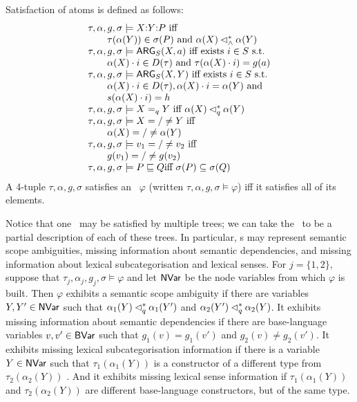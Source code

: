 \begin{definition}\label{defn:satisfaction}
Satisfaction of atoms is defined as follows:
$$
\begin{array}{l}
  \tau, \alpha, g, \sigma \models  X {:} Y {:} P
\mbox{ iff}\\
\qquad \tau(\alpha(Y)) \in \sigma(P) \mbox{ and } \alpha(X) \lhd^*_\wedge
  \alpha(Y) \\
  \tau, \alpha, g, \sigma \models \mathsf{ARG}_S(X,a)
\mbox{ iff exists  $i \in S$ s.t.}\\
\qquad  \alpha(X) \cdot i \in D(\tau) \mbox{ and }
  \tau(\alpha(X) \cdot 
  i) = g(a) \\
  \tau, \alpha, g, \sigma \models \mathsf{ARG}_S(X,Y)
\mbox{ iff  exists $i \in S$ s.t.}\\
\qquad \alpha(X) \cdot i \in D(\tau), \alpha(X) \cdot
  i = \alpha(Y) \mbox{ and }\\
\qquad
s(\alpha(X) \cdot i) = h \\
  \tau, \alpha, g, \sigma \models X =_q Y
\mbox{ iff } \alpha(X) \lhd^*_q \alpha(Y) \\
  \tau, \alpha, g, \sigma \models X ={/}\neq Y
\mbox{ iff } \\
\qquad \alpha(X) ={/}\neq \alpha(Y) \\
  \tau, \alpha, g, \sigma \models v_1 ={/}\neq v_2
\mbox{ iff}\\
\qquad g(v_1) ={/}\neq g(v_2) \\
  \tau, \alpha, g, \sigma \models P \sqsubseteq Q
\mbox{iff $\sigma(P) \subseteq \sigma(Q)$}
\end{array}
$$
A 4-tuple $\tau,\alpha,g,\sigma$ satisfies an \rmrs\ $\varphi$
(written $\tau,\alpha,g,\sigma \models \varphi$) iff it satisfies all
of its elements.
\end{definition}

Notice that one \rmrs\ may be satisfied by multiple trees; we can take
the \rmrs\ to be a partial description of each of these trees.  In
particular, \rmrs s may represent semantic scope ambiguities, missing
information about semantic dependencies, and missing information about
lexical subcategorisation and lexical senses.  For $j=\{1,2\}$,
suppose that $\tau_j,\alpha_j,g_j,\sigma\models \varphi$ and let
$\mathsf{NVar}$ be the node variables from which $\varphi$ is built.  Then
$\varphi$ exhibits a semantic scope ambiguity if there are variables
$Y,Y'\in \mathsf{NVar}$ such that $\alpha_1(Y) \lhd^*_q \alpha_1(Y')$ and
$\alpha_2(Y')\lhd^*_q \alpha_2(Y)$.  It exhibits missing information
about semantic dependencies if there are base-language variables $
v,v'\in \mathsf{BVar}$ such that $g_1(v)=g_1(v')$ and $g_2(v)\neq g_2(v')$.
It exhibits missing lexical subcategorisation information if there is
a variable $ Y \in \mathsf{NVar}$ such that $\tau_1(\alpha_1(Y))$ is a
constructor of a different type from $\tau_2(\alpha_2(Y))$ .  And it exhibits missing lexical sense information
if $\tau_1(\alpha_1(Y))$ and $\tau_2(\alpha_2(Y))$ are different
base-language constructors, but of the same type.


